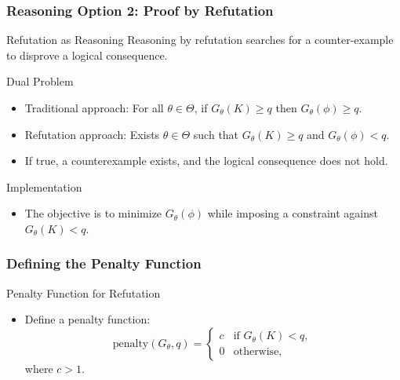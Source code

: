 \documentclass{beamer}
\begin{document}
\begin{frame}
\frametitle{Reasoning Option 2: Proof by Refutation}
\begin{block}{Refutation as Reasoning}
Reasoning by refutation searches for a counter-example to disprove a logical consequence.
\end{block}

\begin{block}{Dual Problem}
\begin{itemize}
    \item Traditional approach: For all \( \theta \in \Theta \), if \( G_\theta(K) \geq q \) then \( G_\theta(\phi) \geq q \).
    \item Refutation approach: Exists \( \theta \in \Theta \) such that \( G_\theta(K) \geq q \) and \( G_\theta(\phi) < q \).
    \item If true, a counterexample exists, and the logical consequence does not hold.
\end{itemize}
\end{block}

\begin{block}{Implementation}
\begin{itemize}
    \item The objective is to minimize \( G_\theta(\phi) \) while imposing a constraint against \( G_\theta(K) < q \).
\end{itemize}
\end{block}
\end{frame}

\begin{frame}
\frametitle{Defining the Penalty Function}
\begin{block}{Penalty Function for Refutation}
\begin{itemize}
    \item Define a penalty function: 
    \[ \text{penalty}(G_\theta, q) = 
       \begin{cases} 
       c & \text{if } G_\theta(K) < q, \\
       0 & \text{otherwise},
       \end{cases} \]
    where \( c > 1 \).
\end{itemize}
\end{block}
\end{frame}
\end{document}
